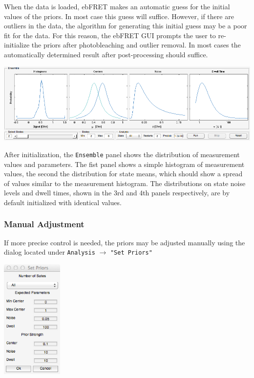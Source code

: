 \documentclass[12pt,article,oldfontcommands]{memoir}
\newcommand{\indt}{\qquad}
\begin{document}
When the data is loaded, ebFRET makes an automatic guess for the initial values of the priors. In most case this guess will suffice. However, if there are outliers in the data, the algorithm for generating this initial guess may be a poor fit for the data. For this reason, the ebFRET GUI prompts the user to re-initialize the priors after photobleaching and outlier removal. In most cases the automatically determined result after post-processing should suffice.

\indt\includegraphics[width=5.5in]{images/ensemble_view}

After initialization, the \texttt{Ensemble} panel shows the distribution of measurement values and parameters. The fist panel shows a simple histogram of measurement values, the second the distribution for state means, which should show a spread of values similar to the measurement histogram. The distributions on state noise levels and dwell times, shown in the 3rd and 4th panels respectively, are by default initialized with identical values.

\subsubsection{Manual Adjustment}

If more precise control is needed, the priors may be adjusted manually using the dialog located under \texttt{Analysis} $\to$ \texttt{"Set Priors"} 

\indt\includegraphics[width=1.2in]{images/set_priors_dialog}
\end{document}
